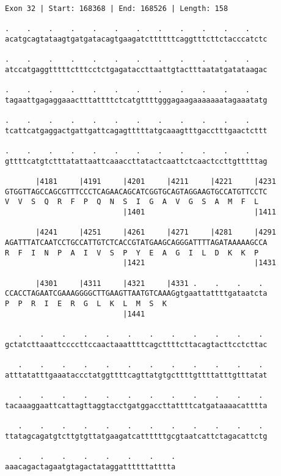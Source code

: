 \documentclass{article}
\begin{document}
\begin{Verbatim}[fontfamily=courier]
Exon 32 | Start: 168368 | End: 168526 | Length: 158

.    .    .    .    .    .    .    .    .    .    .    .    
acatgcagtataagtgatgatacagtgaagatcttttttcaggtttcttctacccatctc

.    .    .    .    .    .    .    .    .    .    .    .    
atccatgaggtttttctttcctctgagataccttaattgtactttaatatgatataagac

.    .    .    .    .    .    .    .    .    .    .    .    
tagaattgagaggaaactttattttctcatgttttgggagaagaaaaaaatagaaatatg

.    .    .    .    .    .    .    .    .    .    .    .    
tcattcatgaggactgattgattcagagtttttatgcaaagtttgacctttgaactcttt

.    .    .    .    .    .    .    .    .    .    .    .    
gttttcatgtctttatattaattcaaaccttatactcaattctcaactccttgtttttag

       |4181     |4191     |4201     |4211     |4221     |4231
GTGGTTAGCCAGCGTTTCCCTCAGAACAGCATCGGTGCAGTAGGAAGTGCCATGTTCCTC
V  V  S  Q  R  F  P  Q  N  S  I  G  A  V  G  S  A  M  F  L  
                           |1401                         |1411

       |4241     |4251     |4261     |4271     |4281     |4291
AGATTTATCAATCCTGCCATTGTCTCACCGTATGAAGCAGGGATTTTAGATAAAAAGCCA
R  F  I  N  P  A  I  V  S  P  Y  E  A  G  I  L  D  K  K  P  
                           |1421                         |1431

       |4301     |4311     |4321     |4331 .    .    .    . 
CCACCTAGAATCGAAAGGGGCTTGAAGTTAATGTCAAAGgtgaattattttgataatcta
P  P  R  I  E  R  G  L  K  L  M  S  K                       
                           |1441                            

   .    .    .    .    .    .    .    .    .    .    .    . 
gctatcttaaattccccttccaactaaattttcagcttttcttacagtacttcctcttac

   .    .    .    .    .    .    .    .    .    .    .    . 
atttatatttgaaataccctatggttttcagttatgtgcttttgttttatttgtttatat

   .    .    .    .    .    .    .    .    .    .    .    . 
tacaaaggaattcattagttaggtacctgatggaccttattttcatgataaaacatttta

   .    .    .    .    .    .    .    .    .    .    .    . 
ttatagcagatgtcttgtgttatgaagatcattttttgcgtaatcattctagacattctg

   .    .    .    .    .    .    .    .
aaacagactagaatgtagactataggattttttatttta
\end{Verbatim}
\end{document}
